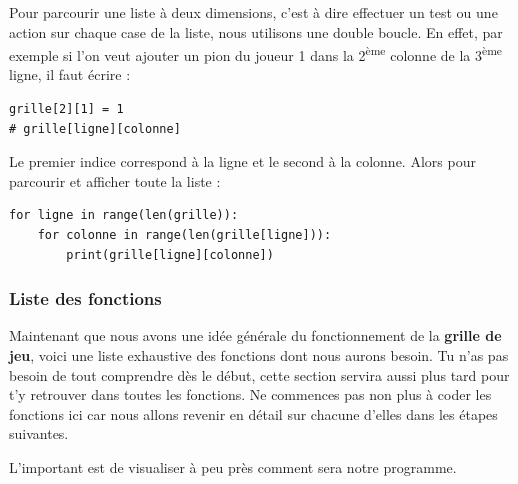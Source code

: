 \documentclass[11pt]{article}
\begin{document}
Pour parcourir une liste à deux dimensions, c'est à dire effectuer un test ou une action sur chaque case de la liste, nous utilisons une double boucle. En effet, par exemple si l'on veut ajouter un pion du joueur 1 dans la 2\textsuperscript{ème} colonne de la 3\textsuperscript{ème} ligne, il faut écrire :
\begin{verbatim}
grille[2][1] = 1
# grille[ligne][colonne]
\end{verbatim}

Le premier indice correspond à la ligne et le second à la colonne. Alors pour parcourir et afficher toute la liste :
\begin{verbatim}
for ligne in range(len(grille)):
    for colonne in range(len(grille[ligne])):
        print(grille[ligne][colonne])
\end{verbatim}

\subsubsection*{Liste des fonctions}
\label{sec:orge50fa41}
Maintenant que nous avons une idée générale du fonctionnement de la \textbf{grille de jeu}, voici une liste exhaustive des fonctions dont nous aurons besoin. Tu n'as pas besoin de tout comprendre dès le début, cette section servira aussi plus tard pour t'y retrouver dans toutes les fonctions. Ne commences pas non plus à coder les fonctions ici car nous allons revenir en détail sur chacune d'elles dans les étapes suivantes.

L'important est de visualiser à peu près comment sera notre programme.
\end{document}
